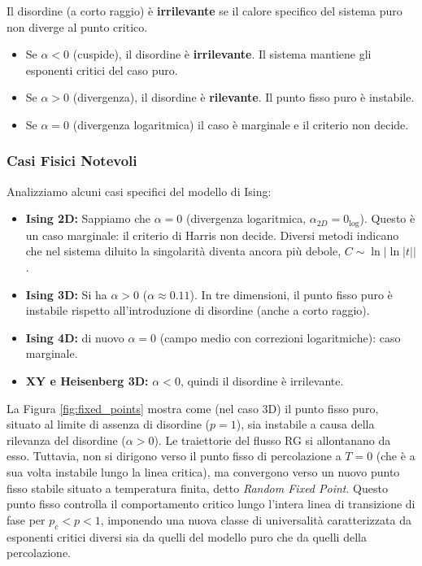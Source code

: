 \begin{tcolorbox}[colback=colorD!10, colframe=colorD!60!colorE, , coltitle=white, title=\textbf{Conclusione sulla Rilevanza}]
Il disordine (a corto raggio) è \textbf{irrilevante} se il calore specifico del sistema puro non diverge al punto critico.
\begin{itemize}
    \item Se $\alpha < 0$ (cuspide), il disordine è \textbf{irrilevante}. Il sistema mantiene gli esponenti critici del caso puro.
    \item Se $\alpha > 0$ (divergenza), il disordine è \textbf{rilevante}. Il punto fisso puro è instabile.
    \item Se $\alpha = 0$ (divergenza logaritmica) il caso è marginale e il criterio non decide.
\end{itemize}
\end{tcolorbox}

\subsubsection{Casi Fisici Notevoli}

Analizziamo alcuni casi specifici del modello di Ising:
\begin{itemize}
    \item \textbf{Ising 2D:} Sappiamo che $\alpha = 0$ (divergenza logaritmica, $\alpha_{2D} = 0_{\log}$). Questo è un caso marginale: il criterio di Harris non decide. Diversi metodi indicano che nel sistema diluito la singolarità diventa ancora più debole, $C \sim \ln|\ln|t||$.
    \item \textbf{Ising 3D:} Si ha $\alpha > 0$ ($\alpha \approx 0.11$). In tre dimensioni, il punto fisso puro è instabile rispetto all'introduzione di disordine (anche a corto raggio).
    \item \textbf{Ising 4D:} di nuovo $\alpha = 0$ (campo medio con correzioni logaritmiche): caso marginale.
    \item \textbf{XY e Heisenberg 3D:} $\alpha < 0$, quindi il disordine è irrilevante.
\end{itemize}

\noindent La Figura \ref{fig:fixed_points} mostra come (nel caso 3D) il punto fisso puro, situato al limite di assenza di disordine ($p = 1$), sia instabile a causa della rilevanza del disordine ($\alpha > 0$). Le traiettorie del flusso RG si allontanano da esso. Tuttavia, non si dirigono verso il punto fisso di percolazione a $T = 0$ (che è a sua volta instabile lungo la linea critica), ma convergono verso un nuovo punto fisso stabile situato a temperatura finita, detto \textit{Random Fixed Point}. Questo punto fisso controlla il comportamento critico lungo l'intera linea di transizione di fase per $p_c < p < 1$, imponendo una nuova classe di universalità caratterizzata da esponenti critici diversi sia da quelli del modello puro che da quelli della percolazione. 

